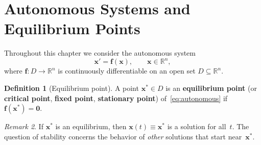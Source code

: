 \documentclass[12pt,a4paper,openany]{book}
\theoremstyle{definition}
\newtheorem{definition}{Definition}[chapter]
\theoremstyle{plain}
\theoremstyle{remark}
\newtheorem{remark}[definition]{Remark}
\newcommand{\R}{\mathbb{R}}
\begin{document}
\begin{center}
\end{center}

\section{Autonomous Systems and Equilibrium Points}
\label{sec:equilibria}

Throughout this chapter we consider the autonomous system
\begin{equation}\label{eq:autonomous}
  \mathbf{x}' = \mathbf{f}(\mathbf{x}),
  \qquad \mathbf{x}\in\R^n,
\end{equation}
where \(\mathbf{f}\colon D\to\R^n\) is continuously differentiable on an
open set \(D\subseteq\R^n\).

\begin{definition}[Equilibrium point]
\label{def:equilibrium}
A point \(\mathbf{x}^*\in D\) is an \textbf{equilibrium point}
(or \textbf{critical point}, \textbf{fixed point}, \textbf{stationary point})
of~\eqref{eq:autonomous} if \(\mathbf{f}(\mathbf{x}^*)=\mathbf{0}\).
\end{definition}

\begin{remark}
\label{rem:constant-solution}
If \(\mathbf{x}^*\) is an equilibrium, then \(\mathbf{x}(t)\equiv\mathbf{x}^*\)
is a solution for all~\(t\). The question of stability concerns the behavior of
\emph{other} solutions that start near~\(\mathbf{x}^*\).
\end{remark}
\end{document}

